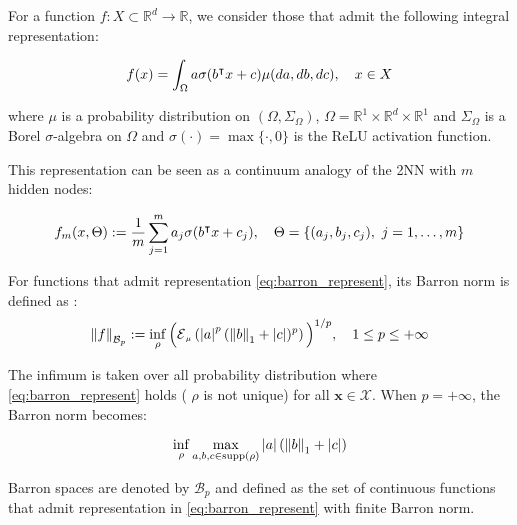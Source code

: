 For a function $f: X \subset \mathbb{R}^d \to \mathbb{R}$, we consider those
that admit the following integral representation:

\begin{equation}\label{eq:barron_represent}
    f(x) = \int_{\Omega} a \sigma(b{}^{\intercal} x + c) \mu(da, db, dc), \quad x \in X
\end{equation}

where $\mu$ is a probability distribution on $(\Omega, \Sigma_\Omega)$, $\Omega
= \mathbb{R}^1 \times \mathbb{R}^d \times \mathbb{R}^1$ and $\Sigma_\Omega$ is
a Borel $\sigma$-algebra on $\Omega$ and $\sigma(\cdot) = \max\{\cdot, 0\}$ is
the ReLU activation function.

This representation can be seen as a continuum analogy of the 2NN with $m$
hidden nodes:

\begin{equation}
    f_m(x, \Theta) := \frac{1}{m} \sum_{j=1}^m a_j \sigma(b{}^{\intercal} x + c_j), \quad \Theta = \{(a_j, b_j, c_j), \ j = 1, \dots, m\}
\end{equation}

\begin{definition} For functions that admit representation
    \eqref{eq:barron_represent}, its Barron norm is defined as
    \cite{eBarronSpaceFlowinduced2021}:
    \begin{equation}\label{eq:barron_norm}
        \barronnorm{f}{p} := \inf_{\rho} \Big(\ERWi{\mu}{\abs{a}^p 
        (\norm{b}_1 + \abs{c})^p}\Big)^{1/p},
        \quad 1 \leq p \leq +\infty
    \end{equation}
\end{definition}

The infimum is taken over all probability distribution where
\eqref{eq:barron_represent} holds ( $\rho$ is not unique) for all $\mathbf{x} \in
    \mathcal{X}$. When $p = + \infty$, the Barron norm becomes:

\begin{equation}
    \inf_{\rho} \max_{a, b, c \in \operatorname{supp}(\rho)} \left| a \right| (\left\| b \right\|_1 + \left| c \right|)
\end{equation}

Barron spaces are denoted by $\mathcal{B}_p$ and defined as the set of
\textit{}{continuous} functions that admit representation in
\eqref{eq:barron_represent} with finite Barron norm.

